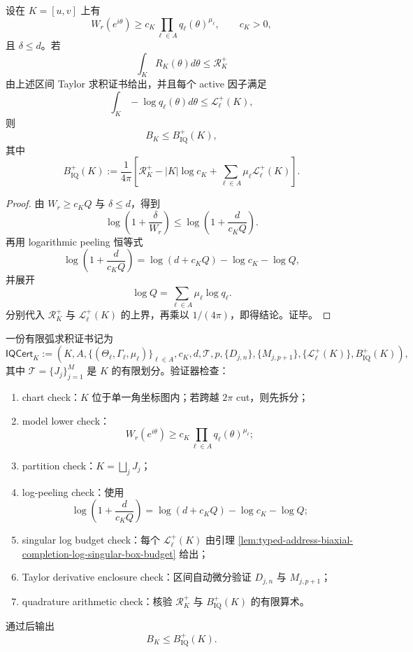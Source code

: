\begin{theorem}\label{thm:typed-address-biaxial-completion-finite-arc-product-kernel-quadrature}
设在 \(K=[u,v]\) 上有
\[
W_r(e^{i\theta})
\ge
c_K
\prod_{\ell\in A}q_\ell(\theta)^{\mu_\ell},
\qquad
c_K>0,
\]
且 \(\delta\le d\)。若
\[
\int_KR_K(\theta)d\theta\le\mathcal R_K^+
\]
由上述区间 Taylor 求积证书给出，并且每个 active 因子满足
\[
\int_K-\log q_\ell(\theta)d\theta
\le
\mathcal L_\ell^+(K),
\]
则
\[
B_K\le B_{\mathrm{IQ}}^+(K),
\]
其中
\[
B_{\mathrm{IQ}}^+(K)
:=
\frac1{4\pi}
\left[
\mathcal R_K^+
-
|K|\log c_K
+
\sum_{\ell\in A}\mu_\ell\mathcal L_\ell^+(K)
\right].
\]
\end{theorem}
\begin{proof}
由 \(W_r\ge c_KQ\) 与 \(\delta\le d\)，得到
\[
\log\left(1+\frac{\delta}{W_r}\right)
\le
\log\left(1+\frac{d}{c_KQ}\right).
\]
再用 logarithmic peeling 恒等式
\[
\log\left(1+\frac{d}{c_KQ}\right)
=
\log(d+c_KQ)-\log c_K-\log Q,
\]
并展开
\[
\log Q=\sum_{\ell\in A}\mu_\ell\log q_\ell.
\]
分别代入 \(\mathcal R_K^+\) 与 \(\mathcal L_\ell^+(K)\) 的上界，再乘以 \(1/(4\pi)\)，即得结论。证毕。
\end{proof}

\begin{definition}[有限弧求积证书]\label{def:typed-address-biaxial-completion-finite-arc-quadrature-certificate}
一份有限弧求积证书记为
\[
\mathsf{IQCert}_K
:=
\left(
K,A,\{(\Theta_\ell,\Gamma_\ell,\mu_\ell)\}_{\ell\in A},
c_K,d,\mathcal T,p,
\{D_{j,n}\},\{M_{j,p+1}\},
\{\mathcal L_\ell^+(K)\},
B_{\mathrm{IQ}}^+(K)
\right),
\]
其中 \(\mathcal T=\{J_j\}_{j=1}^M\) 是 \(K\) 的有限划分。验证器检查：
\begin{enumerate}
  \item chart check：\(K\) 位于单一角坐标图内；若跨越 \(2\pi\) cut，则先拆分；
  \item model lower check：
  \[
  W_r(e^{i\theta})\ge
  c_K\prod_{\ell\in A}q_\ell(\theta)^{\mu_\ell};
  \]
  \item partition check：\(K=\bigsqcup_jJ_j\)；
  \item log-peeling check：使用
  \[
  \log\left(1+\frac{d}{c_KQ}\right)
  =
  \log(d+c_KQ)-\log c_K-\log Q;
  \]
  \item singular log budget check：每个 \(\mathcal L_\ell^+(K)\) 由引理 \ref{lem:typed-address-biaxial-completion-log-singular-box-budget} 给出；
  \item Taylor derivative enclosure check：区间自动微分验证 \(D_{j,n}\) 与 \(M_{j,p+1}\)；
  \item quadrature arithmetic check：核验 \(\mathcal R_K^+\) 与 \(B_{\mathrm{IQ}}^+(K)\) 的有限算术。
\end{enumerate}
通过后输出
\[
B_K\le B_{\mathrm{IQ}}^+(K).
\]
\end{definition}

